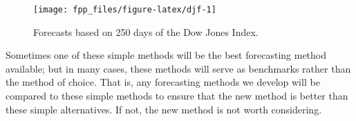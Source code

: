 \documentclass[]{book}
\newenvironment{Shaded}{\begin{snugshade}}{\end{snugshade}}
\newcommand{\CommentTok}[1]{\textcolor[rgb]{0.56,0.35,0.01}{\textit{#1}}}
\newcommand{\DataTypeTok}[1]{\textcolor[rgb]{0.13,0.29,0.53}{#1}}
\newcommand{\DecValTok}[1]{\textcolor[rgb]{0.00,0.00,0.81}{#1}}
\newcommand{\KeywordTok}[1]{\textcolor[rgb]{0.13,0.29,0.53}{\textbf{#1}}}
\newcommand{\NormalTok}[1]{#1}
\newcommand{\OperatorTok}[1]{\textcolor[rgb]{0.81,0.36,0.00}{\textbf{#1}}}
\newcommand{\OtherTok}[1]{\textcolor[rgb]{0.56,0.35,0.01}{#1}}
\newcommand{\StringTok}[1]{\textcolor[rgb]{0.31,0.60,0.02}{#1}}
\begin{document}
\begin{Shaded}
\end{Shaded}

\begin{figure}

{\centering \texttt{[image: fpp\_files/figure-latex/djf-1]} 

}

\caption{Forecasts based on 250 days of the Dow Jones Index.}\label{fig:djf}
\end{figure}

Sometimes one of these simple methods will be the best forecasting method available; but in many cases, these methods will serve as benchmarks rather than the method of choice. That is, any forecasting methods we develop will be compared to these simple methods to ensure that the new method is better than these simple alternatives. If not, the new method is not worth considering.
\end{document}
